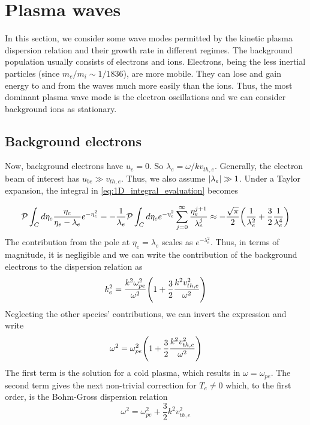 \section{Plasma waves}\label{sec:plasma waves}


In this section, we consider some wave modes permitted by the kinetic plasma
dispersion relation and their growth rate in different regimes.
The background population usually consists of electrons and ions. Electrons,
being the less inertial particles (since $m_e/m_i\sim1/1836$), are more mobile.
They can lose and gain energy to and from the waves much more easily than the
ions. Thus, the most dominant plasma wave mode is the electron oscillations and
we can consider background ions as stationary.

\subsection{Background electrons}

Now, background electrons have $u_e=0$. So $\lambda_e=\omega/kv_{th,e}$.
Generally, the electron beam of interest has $u_{be}\gg v_{th,e}$. Thus, we also
assume $\abs{\lambda_e}\gg1$. Under a Taylor expansion, the integral in
\cref{eq:1D_integral_evaluation} becomes

\begin{equation}
    \mathcal{P}\int_Cd\eta_e\frac{\eta_e}{\eta_e-\lambda_e}e^{-\eta_e^2}
    =-\frac1{\lambda_e}\mathcal{P}\int_Cd\eta_ee^{-\eta_e^2}
        \sum_{j=0}^\infty\frac{\eta_e^{j+1}}{\lambda_e^j}
    \approx-\frac{\sqrt\pi}{2}\qty(\frac1{\lambda_e^2}
        +\frac32\frac1{\lambda_e^4})
\end{equation}
The contribution from the pole at $\eta_e=\lambda_e$ scales as
$e^{-\lambda_e^2}$. Thus, in terms of magnitude, it is negligible and we can
write the contribution of the background electrons to the dispersion relation as
\begin{equation}
    k_e^2=\frac{k^2\omega_{pe}^2}{\omega^2}
        \qty(1+\frac32\frac{k^2v_{th,e}^2}{\omega^2})
\end{equation}
Neglecting the other species' contributions, we can invert the expression and
write
\begin{equation}
    \omega^2=\omega_{pe}^2\qty(1+\frac32\frac{k^2v_{th,e}^2}{\omega^2})
\end{equation}
The first term is the solution for a cold plasma, which results in
$\omega=\omega_{pe}$. The second term gives the next non-trivial correction for
$T_e\neq0$ which, to the first order, is the Bohm-Gross dispersion relation
\begin{equation}
    \omega^2=\omega_{pe}^2+\frac32k^2v_{th,e}^2
\end{equation}


